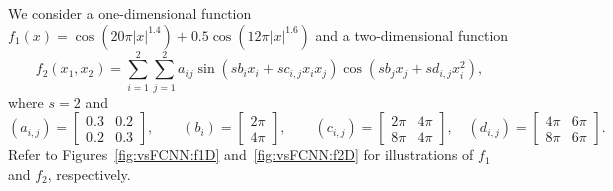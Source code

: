 \documentclass[review,hidelinks,onefignum,onetabnum]{siamart250211}
\begin{document}
We consider  a one-dimensional function \( f_1(x) = \cos(20\pi |x|^{1.4}) + 0.5\cos(12\pi |x|^{1.6}) \) and a two-dimensional function 
\begin{equation*}
	f_{2}(x_1,x_2)= \sum_{i=1}^2\sum_{j=1}^2 a_{ij} \sin(s b_i x_i+s c_{i,j} x_i x_j) \cos (s b_j x_j + s d_{i,j} x_i^2),
\end{equation*}
 where $s=2$ and
\begin{equation*}
	(a_{i,j})=	\begin{bmatrix*}
		0.3 & 0.2 \\ 0.2 & 0.3
	\end{bmatrix*}, \qquad 
	(b_{i})=	\begin{bmatrix*}
		2\pi \\ 4\pi
	\end{bmatrix*},
	\qquad
	(c_{i,j})=	\begin{bmatrix*}
		2\pi & 4\pi \\ 8\pi & 4\pi
	\end{bmatrix*}, \quad 
	(d_{i,j})=	\begin{bmatrix*}
		4\pi & 6\pi \\ 8\pi & 6\pi
	\end{bmatrix*}.
\end{equation*}
Refer to Figures~\ref{fig:vsFCNN:f1D} and~\ref{fig:vsFCNN:f2D} for illustrations of \( f_1 \) and \( f_2 \), respectively.
\end{document}

